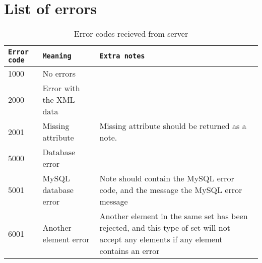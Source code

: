 \newpage
\section{List of errors}

\begin{table}[h]
    \caption{Error codes recieved from server}
    \begin{tabular}{|l|l|p{5cm}|}
        \hline
        \texttt{Error code} & \texttt{Meaning} & \texttt{Extra notes} \\
        \hline
        \hline
        1000 & No errors & \\
        \hline
        \hline
        2000 & Error with the XML data & \\
        \hline
        2001 & Missing attribute & Missing attribute should be returned as a note. \\
        \hline
        \hline
        5000 & Database error & \\
        \hline
        5001 & MySQL database error & Note should contain the MySQL error code, 
        and the message the MySQL error message \\
        \hline
        \hline
        6001 & Another element error & Another element in the same set has been
        rejected, and this type of set will not accept any elements if any
        element contains an error\\
        \hline
    \end{tabular}
    \label{tbl:server_error_codes}
\end{table}
